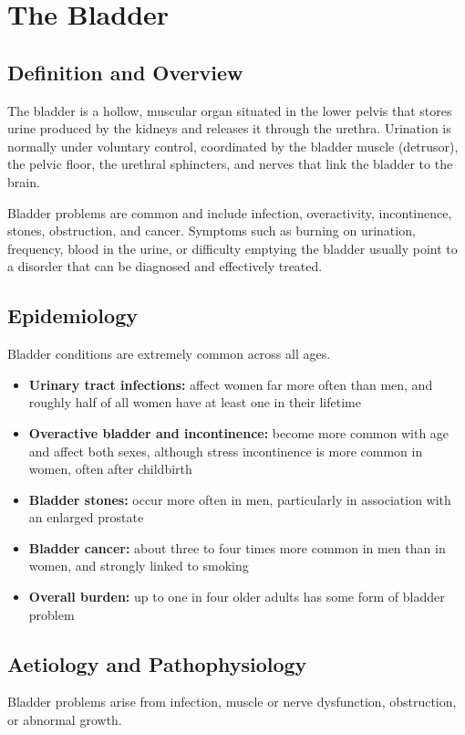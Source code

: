 \chapter{The Bladder}

\section*{Definition and Overview}
The bladder is a hollow, muscular organ situated in the lower pelvis that stores urine produced by the kidneys and releases it through the urethra. Urination is normally under voluntary control, coordinated by the bladder muscle (detrusor), the pelvic floor, the urethral sphincters, and nerves that link the bladder to the brain.

Bladder problems are common and include infection, overactivity, incontinence, stones, obstruction, and cancer. Symptoms such as burning on urination, frequency, blood in the urine, or difficulty emptying the bladder usually point to a disorder that can be diagnosed and effectively treated.

\section*{Epidemiology}
Bladder conditions are extremely common across all ages.

\begin{itemize}
    \item \textbf{Urinary tract infections:} affect women far more often than men, and roughly half of all women have at least one in their lifetime
    \item \textbf{Overactive bladder and incontinence:} become more common with age and affect both sexes, although stress incontinence is more common in women, often after childbirth
    \item \textbf{Bladder stones:} occur more often in men, particularly in association with an enlarged prostate
    \item \textbf{Bladder cancer:} about three to four times more common in men than in women, and strongly linked to smoking
    \item \textbf{Overall burden:} up to one in four older adults has some form of bladder problem
\end{itemize}

\section*{Aetiology and Pathophysiology}
Bladder problems arise from infection, muscle or nerve dysfunction, obstruction, or abnormal growth.

